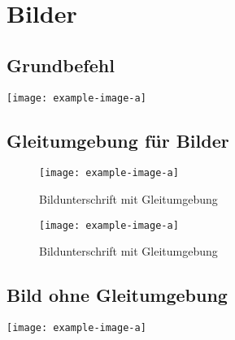 %
\chapter{Bilder}
    \section{Grundbefehl}
        \texttt{[image: example-image-a]}

    \section{Gleitumgebung für Bilder}
        \begin{figure}[htb]                                    %
            \centering                                        %
            \texttt{[image: example-image-a]}
            \caption{Bildunterschrift mit Gleitumgebung}    %
            \label{fig:figure}                                %
        \end{figure}

        \begin{figure}[htb]
            \centering
            \texttt{[image: example-image-a]}
            \caption{Bildunterschrift mit Gleitumgebung}
            \label{fig:figure2}
        \end{figure}

        \clearpage                                            %

    \section{Bild ohne Gleitumgebung}
        \texttt{[image: example-image-a]}
